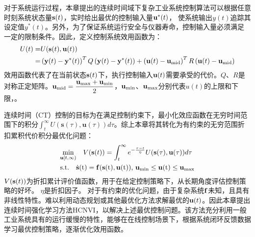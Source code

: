 对于系统运行过程，本章提出的连续时间域下复杂工业系统控制算法可以根据任意时刻系统状态量$\mathbf s(t)$，实时给出最优的控制输入量$\mathbf u^*(t)$，
使系统输出$y(t)$追踪其设定值$y^*(t)$。另外，为了保证系统运行安全与仪器寿命，控制输入量必须满足一定的限制条件。因此，定义控制系统效用函数为：
\begin{equation}
  \begin{aligned}
    U(t)=&U(\mathbf s(t), \mathbf u(t))\\
    =&\left(\mathbf y(t)-\mathbf y^{*}(t)\right)^{T}Q\left(\mathbf y(t)-\mathbf y^{*}(t)\right)+\left(\mathbf u(t)-{\mathbf u_{\text{mid}}}\right)^{T} R\left(\mathbf u(t)-{\mathbf u_{\text{mid}}}\right)
  \end{aligned}
\label{equ:U}
\end{equation}
效用函数代表了在当前状态$\mathbf s(t)$下，执行控制输入${\mathbf u}(t)$需要承受的代价。$Q$、$R$是对称正定矩阵。$\mathbf u_{\text{mid}}=\dfrac{\mathbf u _ { \max } + \mathbf u _ { \min }}{2}$，$\mathbf u _{\min}$、$\mathbf u _{\max}$分别代表$u(t)$的上限和下限，。

连续时间（CT）控制的目标为在满足控制约束下，最小化效应函数在无穷时间范围下的积分$\int_{t}^{\infty} U(\mathbf{s}(\tau), \mathbf{u}(\tau)) d \tau$。综上本章将其转化为有约束的无穷范围折扣累积代价积分最优化问题：
\begin{equation}
\label{equ:goal}
\begin{aligned}
&{\min_{\mathbf u[t,\infty)}} \quad V(\mathbf{s}(t))=\int_{t}^{\infty} e^{-\frac{\tau-t}{\eta}} U(\mathbf{s}(\tau), \mathbf{u}(\tau)) d \tau \\
& \rm{s.t.} \quad \dot{\mathbf{s}}(t)=\mathbf{f}(\mathbf{s}(t), \mathbf{u}(t))\text{, }{{\mathbf u}_{\min }}\le {\mathbf{u}}(t)\le {{\mathbf u}_{\max }}
\end{aligned}
\end{equation}
$V(\mathbf s(t))$为折扣累计评价值函数，用于在给定控制策略下，从长期角度评估控制策略的好坏。
$\eta$是折扣因子。
对于有约束的优化问题，由于复杂系统$\mathbf f$未知，且具有非线性特性。难以利用动态规划或其他最优化方法求解最优的$\mathbf u(t)$。因此本章提出连续时间强化学习方法HCNVI，以解决上述最优控制问题。该方法充分利用一般工业系统具有的运行缓慢的特性，能够在在线控制场景下，根据系统闭环反馈数据学习最优控制策略，逐渐优化效用函数。
